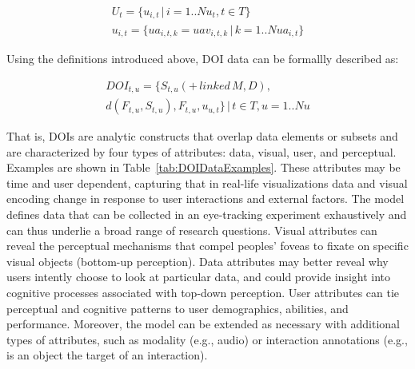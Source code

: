 \vspace{-5mm}
\begin{equation*}
\begin{split}
U_t = \{u_{i,t} \,|\, i=1..N\!u_t, t \in T\} \\
u_{i,t} = \{ua_{i,t,k} = uav_{i,t,k} \,|\, k=1..N\!ua_{i,t}\}
\end{split}
\end{equation*}

Using the definitions introduced above, DOI data can be formallly described as: 

\vspace{-5mm}
\begin{multline*}
DOI_{t,u} = \{S_{t,u} (+\,linked\, M, D), \\ d(F_{t,u}, S_{t,u}), F_{t,u}, u_{u,t}\} \,|\,t \in T, u = 1..N\!u
\end{multline*}

That is, DOIs are analytic constructs that overlap data elements or subsets and are characterized by four types of attributes: data, visual, user, and perceptual. Examples are shown in Table~\ref{tab:DOIDataExamples}. 
These attributes may be time and user dependent, capturing that in real-life visualizations data and visual encoding change in response to user interactions and external factors.  The model defines data that can be collected in an eye-tracking experiment exhaustively and can thus underlie a broad range of research questions. Visual attributes can reveal the perceptual mechanisms that compel peoples' foveas to fixate on specific visual objects (bottom-up perception). Data attributes may better reveal why users intently choose to look at particular data, and could provide insight into cognitive processes associated with top-down perception. User attributes can tie perceptual and cognitive patterns to user demographics, abilities, and performance. Moreover, the model can be extended as necessary with additional types of attributes, such as modality (e.g., audio) or interaction annotations (e.g., is an object the target of an interaction).

